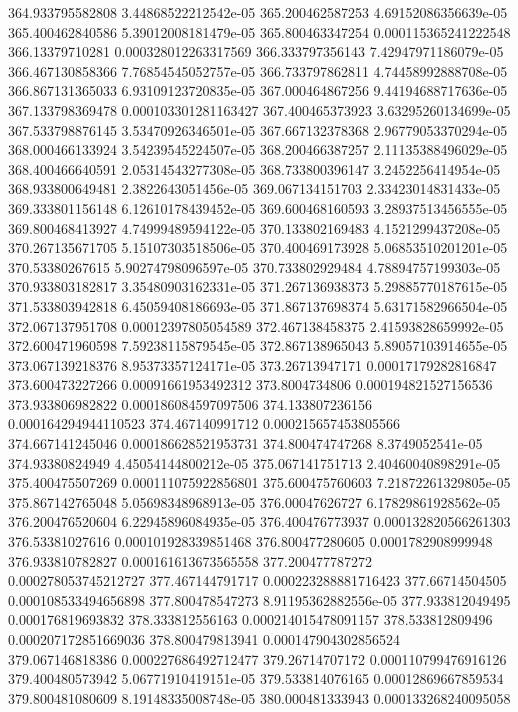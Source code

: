 {364.933795582808 3.44868522212542e-05
365.200462587253 4.69152086356639e-05
365.400462840586 5.39012008181479e-05
365.800463347254 0.000115365241222548
366.13379710281 0.000328012263317569
366.333797356143 7.42947971186079e-05
366.467130858366 7.76854545052757e-05
366.733797862811 4.74458992888708e-05
366.867131365033 6.93109123720835e-05
367.000464867256 9.44194688717636e-05
367.133798369478 0.000103301281163427
367.400465373923 3.63295260134699e-05
367.533798876145 3.53470926346501e-05
367.667132378368 2.96779053370294e-05
368.000466133924 3.54239545224507e-05
368.200466387257 2.11135388496029e-05
368.400466640591 2.05314543277308e-05
368.733800396147 3.2452256414954e-05
368.933800649481 2.3822643051456e-05
369.067134151703 2.33423014831433e-05
369.333801156148 6.12610178439452e-05
369.600468160593 3.28937513456555e-05
369.800468413927 4.74999489594122e-05
370.133802169483 4.1521299437208e-05
370.267135671705 5.15107303518506e-05
370.400469173928 5.06853510201201e-05
370.53380267615 5.90274798096597e-05
370.733802929484 4.78894757199303e-05
370.933803182817 3.35480903162331e-05
371.267136938373 5.29885770187615e-05
371.533803942818 6.45059408186693e-05
371.867137698374 5.63171582966504e-05
372.067137951708 0.00012397805054589
372.467138458375 2.41593828659992e-05
372.600471960598 7.59238115879545e-05
372.867138965043 5.89057103914655e-05
373.067139218376 8.95373357124171e-05
373.26713947171 0.00017179282816847
373.600473227266 0.00091661953492312
373.8004734806 0.000194821527156536
373.933806982822 0.000186084597097506
374.133807236156 0.000164294944110523
374.467140991712 0.000215657453805566
374.667141245046 0.000186628521953731
374.800474747268 8.3749052541e-05
374.93380824949 4.45054144800212e-05
375.067141751713 2.40460040898291e-05
375.400475507269 0.000111075922856801
375.600475760603 7.21872261329805e-05
375.867142765048 5.05698348968913e-05
376.00047626727 6.17829861928562e-05
376.200476520604 6.22945896084935e-05
376.400476773937 0.000132820566261303
376.53381027616 0.000101928339851468
376.800477280605 0.0001782908999948
376.933810782827 0.000161613673565558
377.200477787272 0.000278053745212727
377.467144791717 0.000223288881716423
377.66714504505 0.000108533494656898
377.800478547273 8.91195362882556e-05
377.933812049495 0.000176819693832
378.333812556163 0.000214015478091157
378.533812809496 0.000207172851669036
378.800479813941 0.000147904302856524
379.067146818386 0.000227686492712477
379.26714707172 0.000110799476916126
379.400480573942 5.06771910419151e-05
379.533814076165 0.00012869667859534
379.800481080609 8.19148335008748e-05
380.000481333943 0.000133268240095058
}
